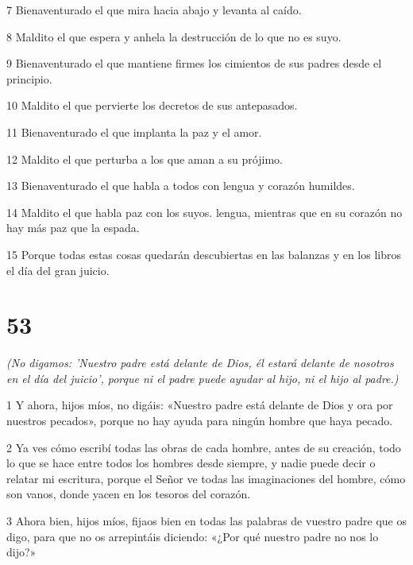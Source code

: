 \par 7 Bienaventurado el que mira hacia abajo y levanta al caído.

\par 8 Maldito el que espera y anhela la destrucción de lo que no es suyo.

\par 9 Bienaventurado el que mantiene firmes los cimientos de sus padres desde el principio.

\par 10 Maldito el que pervierte los decretos de sus antepasados.

\par 11 Bienaventurado el que implanta la paz y el amor.

\par 12 Maldito el que perturba a los que aman a su prójimo.

\par 13 Bienaventurado el que habla a todos con lengua y corazón humildes.

\par 14 Maldito el que habla paz con los suyos. lengua, mientras que en su corazón no hay más paz que la espada.

\par 15 Porque todas estas cosas quedarán descubiertas en las balanzas y en los libros el día del gran juicio.

\chapter{53}

\par \textit{(No digamos: 'Nuestro padre está delante de Dios, él estará delante de nosotros en el día del juicio', porque ni el padre puede ayudar al hijo, ni el hijo al padre.)}

\par 1 Y ahora, hijos míos, no digáis: «Nuestro padre está delante de Dios y ora por nuestros pecados», porque no hay ayuda para ningún hombre que haya pecado.

\par 2 Ya ves cómo escribí todas las obras de cada hombre, antes de su creación, todo lo que se hace entre todos los hombres desde siempre, y nadie puede decir o relatar mi escritura, porque el Señor ve todas las imaginaciones del hombre, cómo son vanos, donde yacen en los tesoros del corazón.

\par 3 Ahora bien, hijos míos, fijaos bien en todas las palabras de vuestro padre que os digo, para que no os arrepintáis diciendo: «¿Por qué nuestro padre no nos lo dijo?»

